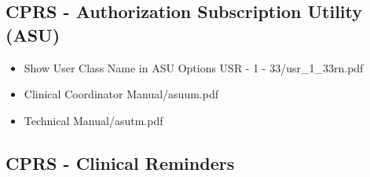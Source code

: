 \documentclass{OSEHRAArticle}
\begin{document}
\subsection{ CPRS -  Authorization Subscription Utility (ASU) }

\begin{itemize}
\item Show User Class Name in ASU Options USR - 1 - 33/usr\_1\_33rn.pdf
\item Clinical Coordinator Manual/asuum.pdf
\item Technical Manual/asutm.pdf
\end{itemize}


\subsection{ CPRS -  Clinical Reminders }
\end{document}

